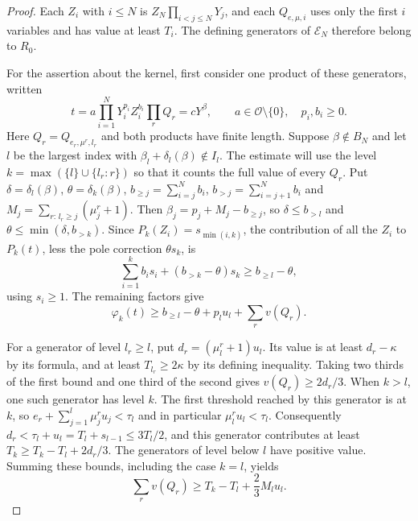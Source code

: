 \documentclass[11pt, letterpaper]{article}
\theoremstyle{definition}
\theoremstyle{remark}
\begin{document}
\begin{proof}
    Each $Z_{i}$ with $i \le N$ is $Z_{N}\prod_{i < j \le N}Y_{j}$, and each $Q_{e, \mu, i}$ uses only the first $i$ variables and has value at least $T_{i}$.
    The defining generators of $\mathcal{E}_{N}$ therefore belong to $R_{0}$.

    For the assertion about the kernel, first consider one product of these generators, written
    \[
        t = a\prod_{i = 1}^{N}Y_{i}^{p_{i}} Z_{i}^{b_{i}}\prod_{r}Q_{r}
          = cY^{\beta},
        \qquad a \in \mathcal{O} \setminus \{0\},\quad p_{i}, b_{i} \ge 0.
    \]
    Here $Q_{r} = Q_{e_{r}, \mu^{r}, l_{r}}$ and both products have finite length.
    Suppose $\beta \notin B_{N}$ and let $l$ be the largest index with $\beta_{l} + \delta_{l}(\beta) \notin I_{l}$.
    The estimate will use the level $k = \max(\{l\} \cup \{l_{r} : r\})$ so that it counts the full value of every $Q_{r}$.
    Put $\delta = \delta_{l}(\beta)$, $\theta = \delta_{k}(\beta)$, $b_{\ge j} = \sum_{i = j}^{N}b_{i}$, $b_{>j} = \sum_{i = j + 1}^{N}b_{i}$ and $M_{j} = \sum_{r:\,l_{r} \ge j}(\mu^{r}_{j} + 1)$.
    Then $\beta_{j} = p_{j} + M_{j} - b_{\ge j}$, so $\delta \le b_{>l}$ and $\theta \le \min(\delta, b_{>k})$.
    Since $P_{k}(Z_{i}) = s_{\min(i, k)}$, the contribution of all the $Z_{i}$ to $P_{k}(t)$, less the pole correction $\theta s_{k}$, is
    \[
        \sum_{i = 1}^{k} b_{i}s_{i} + (b_{>k} - \theta)s_{k} \ge b_{\ge l} - \theta,
    \]
    using $s_{i} \ge 1$.
    The remaining factors give
    \begin{equation}
        \label{eq:transfer-cost}
        \varphi_{k}(t) \ge b_{\ge l} - \theta + p_{l}u_{l} + \sum_{r}v(Q_{r}).
    \end{equation}

    For a generator of level $l_{r} \ge l$, put $d_{r} = (\mu^{r}_{l} + 1)u_{l}$.
    Its value is at least $d_{r} - \kappa$ by its formula, and at least $T_{l_{r}} \ge 2\kappa$ by its defining inequality.
    Taking two thirds of the first bound and one third of the second gives $v(Q_{r}) \ge 2d_{r}/3$.
    When $k > l$, one such generator has level $k$.
    The first threshold reached by this generator is at $k$, so $e_r + \sum_{j = 1}^{l}\mu^{r}_{j}u_{j} < \tau_{l}$ and in particular $\mu^{r}_{l}u_{l} < \tau_{l}$.
    Consequently $d_{r} < \tau_{l} + u_{l} = T_{l} + s_{l - 1} \le 3T_{l}/2$, and this generator contributes at least $T_{k} \ge T_{k} - T_{l} + 2d_{r}/3$.
    The generators of level below $l$ have positive value.
    Summing these bounds, including the case $k = l$, yields
    \[
        \sum_{r}v(Q_{r}) \ge T_{k} - T_{l} + \frac{2}{3} M_{l}u_{l}.
    \]


\end{proof}
\end{document}
